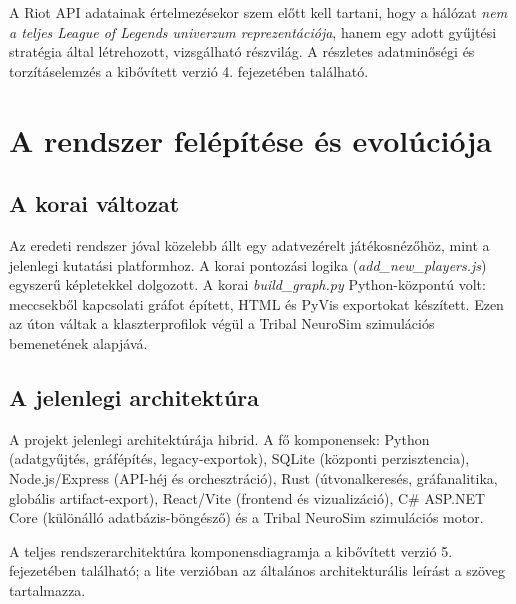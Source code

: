 A Riot API adatainak értelmezésekor szem előtt kell tartani, hogy a hálózat \emph{nem a teljes League of Legends univerzum reprezentációja}, hanem egy adott gyűjtési stratégia által létrehozott, vizsgálható részvilág. A részletes adatminőségi és torzításelemzés a kibővített verzió 4. fejezetében található.

\chapter{A rendszer felépítése és evolúciója}

\section{A korai változat}

Az eredeti rendszer jóval közelebb állt egy adatvezérelt játékosnézőhöz, mint a jelenlegi kutatási platformhoz. A korai pontozási logika (\textit{add\_new\_players.js}) egyszerű képletekkel dolgozott. A korai \textit{build\_graph.py} Python-központú volt: meccsekből kapcsolati gráfot épített, HTML és PyVis exportokat készített. Ezen az úton váltak a klaszterprofilok végül a Tribal NeuroSim szimulációs bemenetének alapjává.

\section{A jelenlegi architektúra}

A projekt jelenlegi architektúrája hibrid. A fő komponensek: Python (adatgyűjtés, gráfépítés, legacy-exportok), SQLite (központi perzisztencia), Node.js/Express (API-héj és orchesztráció), Rust (útvonalkeresés, gráfanalitika, globális artifact-export), React/Vite (frontend és vizualizáció), C\# ASP.NET Core (különálló adatbázis-böngésző) és a Tribal NeuroSim szimulációs motor.

A teljes rendszerarchitektúra komponensdiagramja a kibővített verzió 5. fejezetében található; a lite verzióban az általános architekturális leírást a szöveg tartalmazza.

